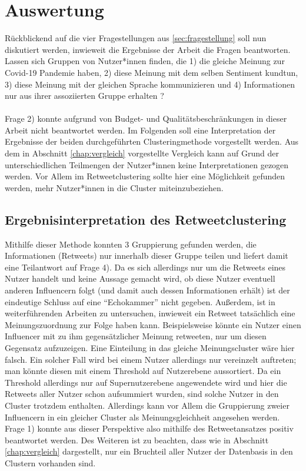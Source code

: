 \chapter{Auswertung}
\label{chap:auswertung}
Rückblickend auf die vier Fragestellungen aus \ref{sec:fragestellung} soll nun diskutiert werden, inwieweit die Ergebnisse der Arbeit die Fragen beantworten. 
Lassen sich Gruppen von Nutzer*innen finden, die 1) die gleiche Meinung zur Covid-19 Pandemie haben, 2) diese Meinung mit dem selben Sentiment kundtun, 3) diese Meinung mit der gleichen Sprache kommunizieren und 4) Informationen nur aus ihrer assoziierten Gruppe erhalten ? \\\\
Frage 2) konnte aufgrund von Budget- und Qualitätsbeschränkungen in dieser Arbeit nicht beantwortet werden.
Im Folgenden soll eine Interpretation der Ergebnisse der beiden durchgeführten Clusteringmethode vorgestellt werden.
Aus dem in Abschnitt \ref{chap:vergleich}  vorgestellte Vergleich kann auf Grund der unterschiedlichen Teilmengen der Nutzer*innen keine Interpretationen gezogen werden. Vor Allem im Retweetclustering sollte hier eine Möglichkeit gefunden werden, mehr Nutzer*innen in die Cluster miteinzubeziehen.
\section{Ergebnisinterpretation des Retweetclustering}
\label{sec:ergebnis-retweet}
Mithilfe dieser Methode konnten 3 Gruppierung gefunden  werden, die Informationen (Retweets) nur innerhalb dieser Gruppe teilen und liefert damit eine Teilantwort auf Frage 4). Da es sich allerdings nur um die Retweets eines Nutzer handelt  und keine Aussage gemacht wird, ob diese Nutzer eventuell anderen Influencern folgt (und damit auch dessen Informationen erhält) ist der eindeutige Schluss auf eine "`Echokammer"' nicht gegeben.
Außerdem, ist in weiterführenden Arbeiten zu untersuchen, inwieweit ein Retweet tatsächlich eine Meinungszuordnung zur Folge haben kann.
Beispielsweise könnte ein Nutzer einen Influencer mit zu ihm gegensätzlicher Meinung retweeten, nur um diesen Gegensatz aufzuzeigen. Eine Einteilung in das gleiche Meinungscluster wäre hier falsch.
Ein solcher Fall wird bei einem Nutzer allerdings nur vereinzelt auftreten; man könnte diesen mit einem Threshold auf Nutzerebene aussortiert. Da ein Threshold allerdings nur auf Supernutzerebene angewendete wird und hier die Retweets aller Nutzer schon aufsummiert wurden, sind solche Nutzer in den Cluster trotzdem enthalten. 
Allerdings kann vor Allem die Gruppierung zweier Influencern in ein gleicher Cluster als Meinungsgleichheit angesehen werden. Frage 1) konnte aus dieser Perspektive also mithilfe des Retweetansatzes positiv beantwortet werden.
Des Weiteren ist zu beachten, dass wie in Abschnitt \ref{chap:vergleich} dargestellt, nur ein Bruchteil aller Nutzer der Datenbasis in den Clustern vorhanden sind.
